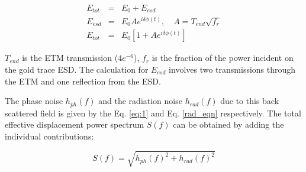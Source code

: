 \documentclass[12pt]{iopart}
\begin{document}
\begin{eqnarray}
    E_{tot} & = & E_{0} + E_{esd} \label{eq:4} \\
    E_{esd} & = & E_{0}Ae^{i{\delta}{\phi}(t)} ,\quad A = T_{end}\sqrt{f_{r}}  \label{eq:5} \\ 
    E_{tot} & = & E_{0}[1 + Ae^{i{\delta}{\phi}(t)}]  \label{eq:6}
\end{eqnarray}


$T_{end}$ is the ETM  transmission ($4e^{-6}$), $f_{r}$ is the fraction of the power incident on the gold trace ESD. The calculation for $E_{esd}$ involves two transmissions through the ETM and one reflection from the ESD.

The phase noise $h_{ph}
(f)$ and the radiation noise $h_{rad}(f)$ due to this back scattered field is given by the Eq. \ref{eq:1} and Eq. \ref{rad_eqn} respectively. 
The total effective displacement power spectrum $S(f)$ can be obtained by adding the individual contributions:

\begin{equation}
S(f) = \sqrt{h_{ph}(f)^2 + h_{rad}(f)^2} \label{total_noise}
\end{equation}
\end{document}
